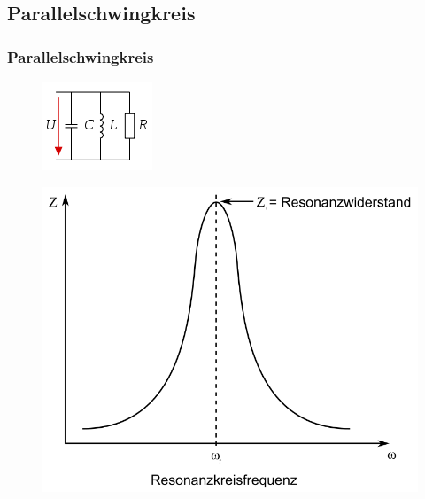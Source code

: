 \subsection*{Parallel\-schwing\-kreis}
\begin{frame}
  \frametitle{Parallelschwingkreis}
  \begin{center}
    \begin{minipage}{0.5\textwidth}
      \begin{figure}
        \includegraphics[height=.45\textheight,width=\textwidth,keepaspectratio]{a04/Parallelschw.png}
      \end{figure}
    \end{minipage}
    \begin{minipage}{0.49\textwidth}
      \begin{figure}
        \includegraphics[height=.45\textheight,width=\textwidth,keepaspectratio]{a04/ParallelschwSig.png}

\end{figure}
\end{minipage}
\end{center}
\end{frame}
